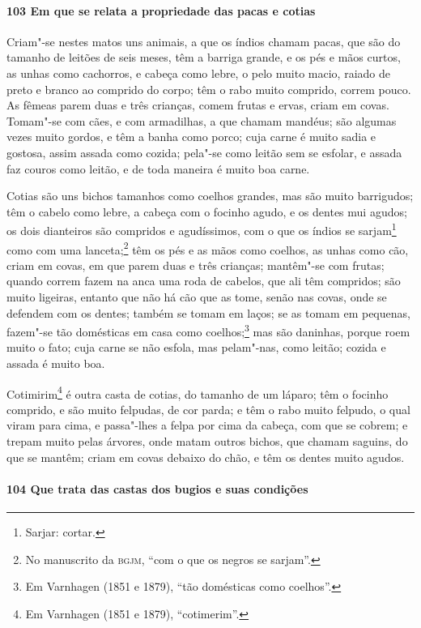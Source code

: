 \paragraph{103 Em que se relata a propriedade das pacas e cotias}

Criam"-se nestes matos uns animais, a que os índios chamam pacas, que são do tamanho de
leitões de seis meses, têm a barriga grande, e os pés e mãos curtos, as unhas como
cachorros, e cabeça como lebre, o pelo muito macio, raiado de preto e branco ao comprido
do corpo; têm o rabo muito comprido, correm pouco. As fêmeas parem duas e três crianças,
comem frutas e ervas, criam em covas. Tomam"-se com cães, e com armadilhas, a que chamam
mandéus; são algumas vezes muito gordos, e têm a banha como porco; cuja carne é muito
sadia e gostosa, assim assada como cozida; pela"-se como leitão sem se esfolar, e assada
faz couros como leitão, e de toda maneira é muito boa carne.

Cotias são uns bichos tamanhos como coelhos grandes, mas são muito barrigudos; têm o
cabelo como lebre, a cabeça com o focinho agudo, e os dentes mui agudos; os dois
dianteiros são compridos e agudíssimos, com o que os índios se sarjam\footnote{ Sarjar:
cortar.} como com uma lanceta;\footnote{ No manuscrito da \textsc{bgjm}, ``com o que os
negros se sarjam''.} têm os pés e as mãos como coelhos, as unhas como cão, criam em covas,
em que parem duas e três crianças; mantêm"-se com frutas; quando correm fazem na anca uma
roda de cabelos, que ali têm compridos; são muito ligeiras, entanto que não há cão que as
tome, senão nas covas, onde se defendem com os dentes; também se tomam em laços; se as
tomam em pequenas, fazem"-se tão domésticas em casa como coelhos;\footnote{ Em Varnhagen
(1851 e 1879), ``tão domésticas como coelhos''.} mas são daninhas, porque roem muito o
fato; cuja carne se não esfola, mas pelam"-nas, como leitão; cozida e assada é muito boa.

Cotimirim\footnote{ Em Varnhagen (1851 e 1879), ``cotimerim''.} é outra casta de cotias,
do tamanho de um láparo; têm o focinho comprido, e são muito felpudas, de cor parda; e têm
o rabo muito felpudo, o qual viram para cima, e passa"-lhes a felpa por cima da cabeça, com
que se cobrem; e trepam muito pelas árvores, onde matam outros bichos, que chamam saguins,
do que se mantêm; criam em covas debaixo do chão, e têm os dentes muito agudos.

\paragraph{104 Que trata das castas dos bugios e suas condições}

